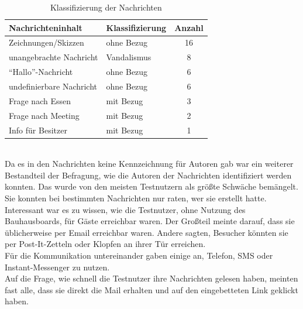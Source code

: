 \begin{table}[h!]
  \caption{Klassifizierung der Nachrichten}
  \begin{tabularx}{\textwidth}{|X|X|c|}
    \hline
    \textbf{Nachrichteninhalt} & \textbf{Klassifizierung} & \textbf{Anzahl} \\\hline
    Zeichnungen/Skizzen & ohne Bezug & 16 \\\hline
    unangebrachte Nachricht & Vandalismus & 8 \\\hline
    ``Hallo''-Nachricht & ohne Bezug & 6 \\\hline
    undefinierbare Nachricht & ohne Bezug & 6 \\\hline
    Frage nach Essen & mit Bezug & 3 \\\hline
    Frage nach Meeting & mit Bezug & 2 \\\hline
    Info für Besitzer & mit Bezug & 1 \\\hline
  \end{tabularx}
  \label{table:funVsContentMsg}
\end{table}
\\
Da es in den Nachrichten keine Kennzeichnung für Autoren gab war ein weiterer Bestandteil der Befragung, wie die Autoren der Nachrichten identifiziert werden konnten.
Das wurde von den meisten Testnutzern als größte Schwäche bemängelt.
Sie konnten bei bestimmten Nachrichten nur raten, wer sie erstellt hatte.
\\
Interessant war es zu wissen, wie die Testnutzer, ohne Nutzung des Bauhausboards, für Gäste erreichbar waren.
Der Großteil meinte darauf, dass sie üblicherweise per Email erreichbar waren.
Andere sagten, Besucher könnten sie per Post-It-Zetteln oder Klopfen an ihrer Tür erreichen.
\\
Für die Kommunikation untereinander gaben einige an, Telefon, SMS oder Instant-Messenger zu nutzen.
\\
Auf die Frage, wie schnell die Testnutzer ihre Nachrichten gelesen haben, meinten fast alle, dass sie direkt die Mail erhalten und auf den eingebetteten Link geklickt haben.
